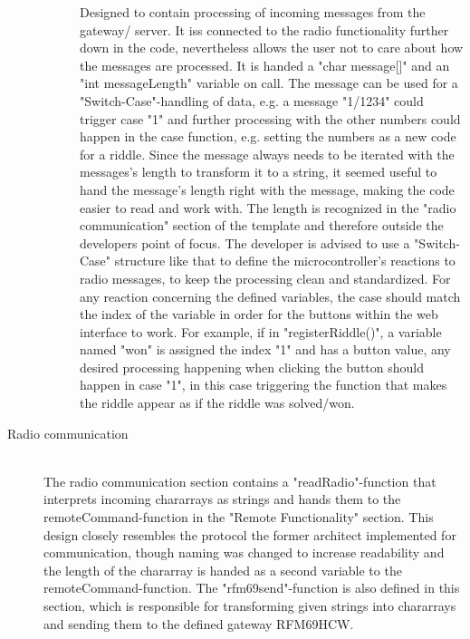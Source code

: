 \begin{description}
\begin{description}
					Designed to contain processing of incoming messages from the gateway/ server.
		            It iss connected to the radio functionality further down in the code, nevertheless allows the user not to care about how the messages are processed.
					It is handed a "char message[]" and an "int messageLength" variable on call. 
					The message can be used for a "Switch-Case"-handling of data, e.g. a message "1/1234" could trigger case "1" and further processing with the other numbers could happen in the case function, e.g. setting the numbers as a new code for a riddle.
					Since the message always needs to be iterated with the messages's length to transform it to a string, it seemed useful to hand the message's length right with the message, making the code easier to read and work with. 
					The length is recognized in the "radio communication" section of the template and therefore outside the developers point of focus.
		            The developer is advised to use a "Switch-Case" structure like that to define the microcontroller's reactions to radio messages, to keep the processing clean and standardized.
					For any reaction concerning the defined variables, the case should match the index of the variable in order for the buttons within the web interface to work.
					For example, if in "registerRiddle()", a variable named "won" is assigned the index "1" and has a button value, 
					any desired processing happening when clicking the button should happen in case "1", in this case triggering the function that makes the riddle appear as if the riddle was solved/won.
		
	      \end{description}
	\item[Radio communication]\hfill \\
		  The radio communication section contains a "readRadio"-function that interprets incoming chararrays as strings and hands them to the remoteCommand-function in the "Remote Functionality" section.
		  This design closely resembles the protocol the former architect implemented for communication, though naming was changed to increase readability and the length of the chararray is handed as a second variable to the remoteCommand-function.
		  The "rfm69send"-function is also defined in this section, which is responsible for transforming given strings into chararrays and sending them to the defined gateway RFM69HCW.
\end{description}


